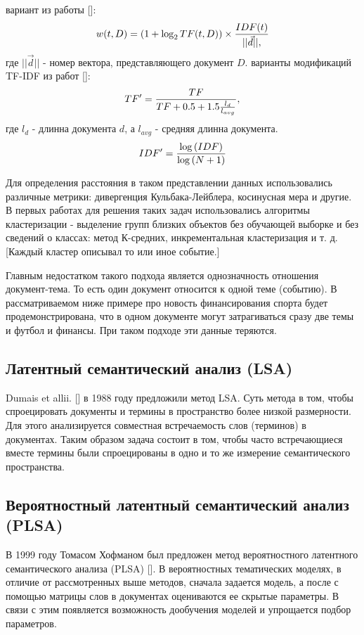  вариант из работы [\todo{}]:
$$
w(t,D)=(1+\log_2{TF(t,D)}) \times {{IDF(t)}\over{||\vec{d}||},}
$$
где $||\vec{d}||$ - номер вектора, представляющего документ $D$.
 варианты модификаций TF-IDF из работ [\todo{}]:
$$
TF'={{TF}\over{TF+0.5+1.5{{l_d}\over{l_{avg}}}}},
$$
где $l_d$ - длинна документа $d$, а $l_{avg}$ - средняя длинна документа.
$$
IDF'={{\log{(IDF)}}\over{\log{(N+1)}}}
$$

Для определения расстояния в таком представлении данных использовались различные метрики: дивергенция Кульбака-Лейблера, косинусная мера и другие. В первых работах для решения таких задач использовались алгоритмы кластеризации - выделение групп близких объектов без обучающей выборке и без сведений о классах: метод К-средних, инкрементальная кластеризация и т. д.[Каждый кластер описывал то или иное событие.]

Главным недостатком такого подхода является однозначность отношения документ-тема. То есть один документ относится к одной теме (событию). В рассматриваемом ниже примере про новость финансирования спорта будет продемонстрирована, что в одном документе могут затрагиваться сразу две темы и футбол и финансы. При таком подходе эти данные теряются.
\subsection{Латентный семантический анализ (LSA)}

Dumais et allii. [\todo{}] в 1988 году предложили метод LSA. Суть метода в том, чтобы спроецировать документы и термины в пространство более низкой размерности. Для этого анализируется совместная встречаемость слов (терминов) в документах. Таким образом задача состоит в том, чтобы часто встречающиеся вместе термины были спроецированы в одно и то же измерение семантического пространства.


\subsection{Вероятностный латентный семантический анализ (PLSA)}

 
В 1999 году Томасом Хофманом был предложен метод вероятностного латентного семантического анализа (PLSA) [\todo{}]. В вероятностных тематических моделях, в отличие от рассмотренных выше методов, сначала задается модель, а после с помощью матрицы слов в документах оцениваются ее скрытые параметры. В связи с этим появляется возможность дообучения моделей и упрощается подбор параметров.

